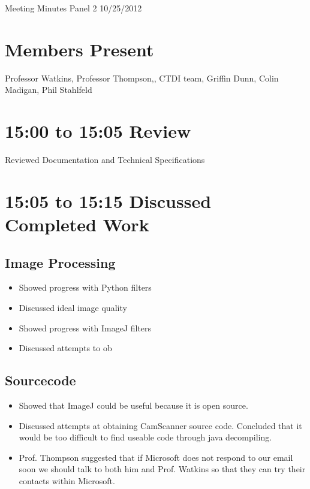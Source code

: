 \documentclass[]{article}
\begin{document}
	Meeting Minutes Panel 2 10/25/2012
	
	\section*{Members Present}
		Professor Watkins, Professor Thompson,, CTDI team, Griffin Dunn, Colin Madigan, Phil Stahlfeld
	\section*{15:00 to 15:05 Review}
		
		Reviewed Documentation and Technical Specifications \\
		
	\section*{15:05 to 15:15 Discussed Completed Work}
		
		\subsection*{Image Processing}
			\begin{itemize}
				\item Showed progress with Python filters
				\item Discussed ideal image quality
				\item Showed progress with ImageJ filters
				\item Discussed attempts to ob
			\end{itemize}
		
		\subsection*{Sourcecode}
			\begin{itemize}
				\item Showed that ImageJ could be useful because it is open source. \\
				\item Discussed attempts at obtaining CamScanner source code. Concluded that it would be too difficult to find useable code through java decompiling. \\
				\item Prof. Thompson suggested that if Microsoft does not respond to our email soon we should talk to both him and Prof. Watkins so that they can try their contacts within Microsoft. \\
			\end{itemize}
		
\end{document}
